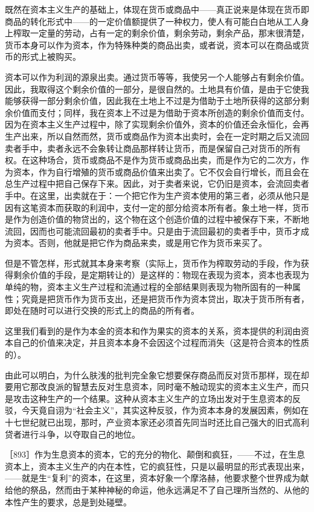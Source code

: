 既然在资本主义生产的基础上，体现在货币或商品中——真正说来是体现在货币即商品的转化形式中——的一定价值额提供了一种权力，使人有可能白白地从工人身上榨取一定量的劳动，占有一定的剩余价值，剩余劳动，剩余产品，那末很清楚，货币本身可以作为资本，作为特殊种类的商品出卖，或者说，资本可以在商品或货币的形式上被购买。

资本可以作为利润的源泉出卖。通过货币等等，我使另一个人能够占有剩余价值。因此，我取得这个剩余价值的一部分，是很自然的。土地具有价值，是由于它使我能够获得一部分剩余价值，因此我在土地上不过是为借助于土地所获得的这部分剩余价值而支付；同样，我在资本上不过是为借助于资本所创造的剩余价值而支付。因为在资本主义生产过程中，除了实现剩余价值外，资本的价值还会永恒化，会再生产出来，所以自然而然，货币或商品作为资本出卖时，会在一定时期之后又流回卖者手中，卖者永远不会象转让商品那样转让货币，而是保留自己对货币的所有权。在这种场合，货币或商品不是作为货币或商品出卖，而是作为它的二次方，作为资本，作为自行增殖的货币或商品价值来出卖了。它不仅会自行增长，而且会在总生产过程中把自己保存下来。因此，对于卖者来说，它仍旧是资本，会流回卖者手中。在这里，出卖就在于：一个把它作为生产资本使用的第三者，必须从他只是因有这笔资本而获取的利润中，支付一定的部分给资本所有者。象土地一样，货币是作为创造价值的物贷出的，这个物在这个创造价值的过程中被保存下来，不断地流回，因而也可能流回最初的卖者手中。只是由于流回最初的卖者手中，货币才成为资本。否则，他就是把它作为商品来卖，或是用它作为货币来买了。

但是不管怎样，形式就其本身来考察（实际上，货币作为榨取劳动的手段，作为获得剩余价值的手段，是定期转让的）是这样的：物现在表现为资本，资本也表现为单纯的物，资本主义生产过程和流通过程的全部结果则表现为物所固有的一种属性；究竟是把货币作为货币支出，还是把货币作为资本贷出，取决于货币所有者，即处在随时可以进行交换的形式上的商品的所有者。

这里我们看到的是作为本金的资本和作为果实的资本的关系，资本提供的利润由资本自己的价值来决定，并且资本本身不会因这个过程而消失（这是符合资本的性质的）。

由此可以明白，为什么肤浅的批判完全象它想要保存商品而反对货币那样，现在却要用它那改良派的智慧去反对生息资本，同时毫不触动现实的资本主义生产，而只是攻击这种生产的一个结果。这种从资本主义生产的立场出发对于生息资本的反驳，今天竟自诩为“社会主义”，其实这种反驳，作为资本本身的发展因素，例如在十七世纪就已出现，那时，产业资本家还必须首先同当时还比自己强大的旧式高利贷者进行斗争，以夺取自己的地位。

［893］作为生息资本的资本，它的充分的物化、颠倒和疯狂，——不过，在生息资本上，资本主义生产的内在本性，它的疯狂性，只是以最明显的形式表现出来，——就是生“复利”的资本，在这里，资本好象一个摩洛赫，他要求整个世界成为献给他的祭品，然而由于某种神秘的命运，他永远满足不了自己理所当然的、从他的本性产生的要求，总是到处碰壁。

